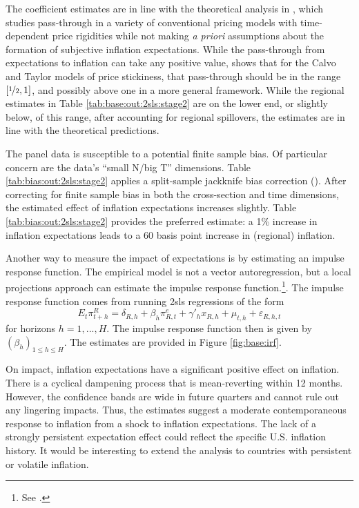 \documentclass[12pt]{article}
\begin{document}
The coefficient estimates are in line with the theoretical analysis in \cite{Werning:expectsWP}, which studies pass-through in a variety of conventional pricing models with time-dependent price rigidities while not making \emph{a priori} assumptions about the formation of subjective inflation expectations. While the pass-through from expectations to inflation can take any positive value, \cite{Werning:expectsWP} shows that for the Calvo and Taylor models of price stickiness, that pass-through should be in the range $\left[\nicefrac{1}{2},1\right]$, and possibly above one in a more general framework. While the regional estimates in Table \ref{tab:base:out:2sls:stage2} are on the lower end, or slightly below, of this range, after accounting for regional spillovers, the estimates are in line with the theoretical predictions.

The panel data is susceptible to a potential finite sample bias. Of particular concern are the data's ``small N/big T'' dimensions. Table \ref{tab:bias:out:2sls:stage2} applies a split-sample jackknife bias correction (\cite{FernandezValWeidner:FE}). After correcting for finite sample bias in both the cross-section and time dimensions, the estimated effect of inflation expectations increases slightly. Table \ref{tab:bias:out:2sls:stage2} provides the preferred estimate: a 1\% increase in inflation expectations leads to a 60 basis point increase in (regional) inflation.



Another way to measure the impact of expectations is by estimating an impulse response function. The empirical model is not a vector autoregression, but a local projections approach can estimate the impulse response function.\footnote{See \cite{Jorda:LP}.}. The impulse response function comes from running 2sls regressions of the form
$$ E_t\pi^R_{t+h} = \delta_{R,h} + \beta_h\pi^e_{R,t} + \gamma'_h x_{R,h} + \mu_{t,h} + \varepsilon_{R,h,t}$$
for horizons $h=1,...,H$. The impulse response function then is given by $\left(\beta_h\right)_{1\leq h\leq H}$. The estimates are provided in Figure \ref{fig:base:irf}.

On impact, inflation expectations have a significant positive effect on inflation. There is a cyclical dampening process that is mean-reverting within 12 months. However, the confidence bands are wide in future quarters and cannot rule out any lingering impacts. Thus, the estimates suggest a moderate contemporaneous response to inflation from a shock to inflation expectations. The lack of a strongly persistent expectation effect could reflect the specific U.S. inflation history. It would be interesting to extend the analysis to countries with persistent or volatile inflation.
\end{document}
